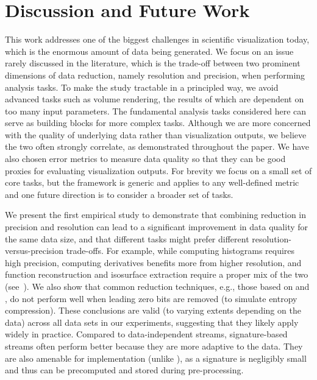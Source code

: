 \section{Discussion and Future Work}

This work addresses one of the biggest challenges in scientific visualization today, which is the
enormous amount of data being generated. We focus on an issue rarely discussed in the literature,
which is the trade-off between two prominent dimensions of data reduction, namely resolution and
precision, when performing analysis tasks. To make the study tractable in a principled way, we avoid
advanced tasks such as volume rendering, the results of which are dependent on too many input
parameters. The fundamental analysis tasks considered here can serve as building blocks for more
complex tasks. Although we are more concerned with the quality of underlying data rather than
visualization outputs, we believe the two often strongly correlate, as demonstrated throughout the
paper. We have also chosen error metrics to measure data quality so that they can be good proxies
for evaluating visualization outputs. For brevity we focus on a small set of core tasks, but the
framework is generic and applies to any well-defined metric and one future direction is to consider
a broader set of tasks. 

We present the first empirical study to demonstrate that combining reduction in precision and
resolution can lead to a significant improvement in data quality for the same data size, and that
different tasks might prefer different resolution-versus-precision trade-offs. For example, while
computing histograms requires high precision, computing derivatives benefits more from higher
resolution, and function reconstruction and isosurface extraction require a proper mix of the two
(see~). We also show that common reduction techniques, e.g., those based on
\slvl and \smag, do not perform well when leading zero bits are removed (to simulate entropy
compression). These conclusions are valid (to varying extents depending on the data) across all data
sets in our experiments, suggesting that they likely apply widely in practice. Compared to
data-independent streams, signature-based streams often perform better because they are more
adaptive to the data. They are also amenable for implementation (unlike \sopt), as a signature is
negligibly small and thus can be precomputed and stored during pre-processing.

